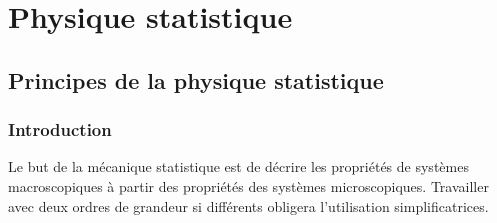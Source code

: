 \documentclass	[11pt, a4paper, openany]{book}
\begin{document}
		
		
		
		
		
		
		
		
		
		
		
		
		
		
		\part{Physique statistique}
		\setcounter{chapter}{12}
		\chapter{Principes de la physique statistique}
		\section{Introduction}
		Le but de la mécanique statistique est de décrire les propriétés de systèmes macroscopiques à partir des 
		propriétés des systèmes microscopiques. Travailler avec deux ordres de grandeur si différents obligera 
		l'utilisation simplificatrices.
		
\end{document}

